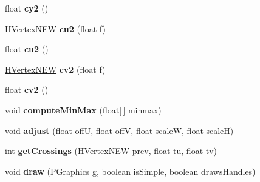 \begin{DoxyCompactItemize}
\item 
\hypertarget{classhype_1_1extended_1_1util_1_1_h_vertex_n_e_w_a8af9436c090bf915e293dfc656a05d18}{float {\bfseries cy2} ()}\label{classhype_1_1extended_1_1util_1_1_h_vertex_n_e_w_a8af9436c090bf915e293dfc656a05d18}

\item 
\hypertarget{classhype_1_1extended_1_1util_1_1_h_vertex_n_e_w_a3b0a7b1b1c356f1047c8e30c0995e366}{\hyperlink{classhype_1_1extended_1_1util_1_1_h_vertex_n_e_w}{H\-Vertex\-N\-E\-W} {\bfseries cu2} (float f)}\label{classhype_1_1extended_1_1util_1_1_h_vertex_n_e_w_a3b0a7b1b1c356f1047c8e30c0995e366}

\item 
\hypertarget{classhype_1_1extended_1_1util_1_1_h_vertex_n_e_w_a8d7bcf53576068ce43d52ada8d1580ac}{float {\bfseries cu2} ()}\label{classhype_1_1extended_1_1util_1_1_h_vertex_n_e_w_a8d7bcf53576068ce43d52ada8d1580ac}

\item 
\hypertarget{classhype_1_1extended_1_1util_1_1_h_vertex_n_e_w_ab1430d73911336abaddb96991e509e9d}{\hyperlink{classhype_1_1extended_1_1util_1_1_h_vertex_n_e_w}{H\-Vertex\-N\-E\-W} {\bfseries cv2} (float f)}\label{classhype_1_1extended_1_1util_1_1_h_vertex_n_e_w_ab1430d73911336abaddb96991e509e9d}

\item 
\hypertarget{classhype_1_1extended_1_1util_1_1_h_vertex_n_e_w_ad7fef48a295eecbc7ef37318791a2329}{float {\bfseries cv2} ()}\label{classhype_1_1extended_1_1util_1_1_h_vertex_n_e_w_ad7fef48a295eecbc7ef37318791a2329}

\item 
\hypertarget{classhype_1_1extended_1_1util_1_1_h_vertex_n_e_w_a29f5f9cbb4c8a7eb2df730f2a7bbb305}{void {\bfseries compute\-Min\-Max} (float\mbox{[}$\,$\mbox{]} minmax)}\label{classhype_1_1extended_1_1util_1_1_h_vertex_n_e_w_a29f5f9cbb4c8a7eb2df730f2a7bbb305}

\item 
\hypertarget{classhype_1_1extended_1_1util_1_1_h_vertex_n_e_w_a770d61c84bfdc286c6a2d5eb60cca5dd}{void {\bfseries adjust} (float off\-U, float off\-V, float scale\-W, float scale\-H)}\label{classhype_1_1extended_1_1util_1_1_h_vertex_n_e_w_a770d61c84bfdc286c6a2d5eb60cca5dd}

\item 
\hypertarget{classhype_1_1extended_1_1util_1_1_h_vertex_n_e_w_ae1feecfba811f8ca358cf69a1690507c}{int {\bfseries get\-Crossings} (\hyperlink{classhype_1_1extended_1_1util_1_1_h_vertex_n_e_w}{H\-Vertex\-N\-E\-W} prev, float tu, float tv)}\label{classhype_1_1extended_1_1util_1_1_h_vertex_n_e_w_ae1feecfba811f8ca358cf69a1690507c}

\item 
\hypertarget{classhype_1_1extended_1_1util_1_1_h_vertex_n_e_w_ae42603905c060f5877d89adbec8ed145}{void {\bfseries draw} (P\-Graphics g, boolean is\-Simple, boolean draws\-Handles)}\label{classhype_1_1extended_1_1util_1_1_h_vertex_n_e_w_ae42603905c060f5877d89adbec8ed145}

\end{DoxyCompactItemize}


